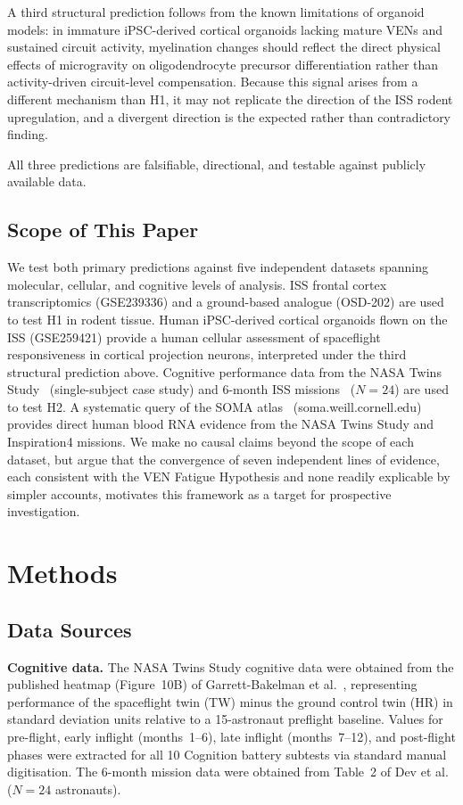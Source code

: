\documentclass[11pt]{article}
\begin{document}
A third structural prediction follows from the known limitations of
organoid models: in immature iPSC-derived cortical organoids lacking mature
VENs and sustained circuit activity, myelination changes should reflect the
direct physical effects of microgravity on oligodendrocyte precursor
differentiation rather than activity-driven circuit-level compensation.
Because this signal arises from a different mechanism than H1, it may not
replicate the direction of the ISS rodent upregulation, and a divergent
direction is the expected rather than contradictory finding.

All three predictions are falsifiable, directional, and testable against
publicly available data.

\subsection{Scope of This Paper}

We test both primary predictions against five independent datasets spanning
molecular, cellular, and cognitive levels of analysis.
ISS frontal cortex transcriptomics (GSE239336) and a ground-based analogue
(OSD-202) are used to test H1 in rodent tissue.
Human iPSC-derived cortical organoids flown on the ISS (GSE259421) provide
a human cellular assessment of spaceflight responsiveness in cortical
projection neurons, interpreted under the third structural prediction above.
Cognitive performance data from the NASA Twins Study~\cite{garrett2019}
(single-subject case study) and 6-month ISS missions~\cite{dev2024}
($N=24$) are used to test H2.
A systematic query of the SOMA atlas~\cite{overbey2024}
(soma.weill.cornell.edu) provides direct human blood RNA evidence
from the NASA Twins Study and Inspiration4 missions.
We make no causal claims beyond the scope of each dataset, but argue that
the convergence of seven independent lines of evidence, each consistent
with the VEN Fatigue Hypothesis and none readily explicable by simpler
accounts, motivates this framework as a target for prospective investigation.

\section{Methods}

\subsection{Data Sources}

\textbf{Cognitive data.}
The NASA Twins Study cognitive data were obtained from the published heatmap
(Figure~10B) of Garrett-Bakelman et al.~\cite{garrett2019}, representing
performance of the spaceflight twin (TW) minus the ground control twin (HR)
in standard deviation units relative to a 15-astronaut preflight baseline.
Values for pre-flight, early inflight (months~1--6), late inflight
(months~7--12), and post-flight phases were extracted for all 10 Cognition
battery subtests via standard manual digitisation.
The 6-month mission data were obtained from Table~2 of Dev et al.\
\cite{dev2024} ($N=24$ astronauts).
\end{document}
